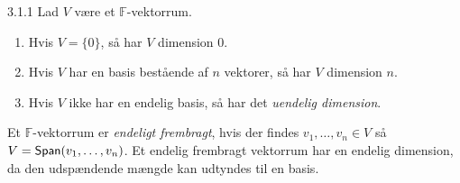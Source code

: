 \begin{definition}{3.1.1}
	Lad $V$ være et $\mathbb{F}$-vektorrum.
	\begin{enumerate}
		\item Hvis $V = \{0\}$, så har $V$ dimension 0.
		\item Hvis $V$ har en basis bestående af $n$ vektorer, så har $V$ 
			dimension $n$.
		\item Hvis $V$ ikke har en endelig basis, så har det 
			\textit{uendelig dimension}.
	\end{enumerate}
	Et $\mathbb{F}$-vektorrum er \textit{endeligt frembragt}, hvis der findes 
	$v_1, \dotsc, v_n \in V$ så $V = \textsf{Span}(v_1, \dotsc, v_n)$. Et endelig 
	frembragt vektorrum har en endelig dimension, da den udspændende mængde kan
	udtyndes til en basis.
\end{definition}
